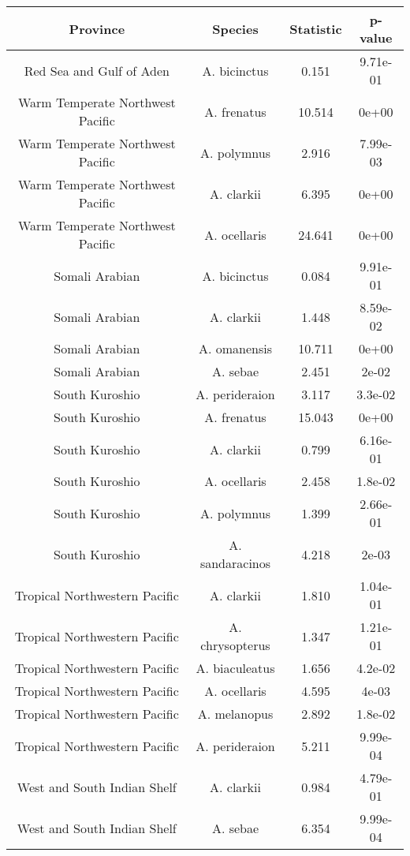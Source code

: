 \begin{table}[!h]
\centering\centering
\centering
\begin{tabular}[t]{c|c|c|c}
\hline
Province & Species & Statistic & p-value\\
\hline
Red Sea and Gulf of Aden & A. bicinctus & 0.151 & 9.71e-01\\
\hline
Warm Temperate Northwest Pacific & A. frenatus & 10.514 & 0e+00\\
\hline
Warm Temperate Northwest Pacific & A. polymnus & 2.916 & 7.99e-03\\
\hline
Warm Temperate Northwest Pacific & A. clarkii & 6.395 & 0e+00\\
\hline
Warm Temperate Northwest Pacific & A. ocellaris & 24.641 & 0e+00\\
\hline
Somali Arabian & A. bicinctus & 0.084 & 9.91e-01\\
\hline
Somali Arabian & A. clarkii & 1.448 & 8.59e-02\\
\hline
Somali Arabian & A. omanensis & 10.711 & 0e+00\\
\hline
Somali Arabian & A. sebae & 2.451 & 2e-02\\
\hline
South Kuroshio & A. perideraion & 3.117 & 3.3e-02\\
\hline
South Kuroshio & A. frenatus & 15.043 & 0e+00\\
\hline
South Kuroshio & A. clarkii & 0.799 & 6.16e-01\\
\hline
South Kuroshio & A. ocellaris & 2.458 & 1.8e-02\\
\hline
South Kuroshio & A. polymnus & 1.399 & 2.66e-01\\
\hline
South Kuroshio & A. sandaracinos & 4.218 & 2e-03\\
\hline
Tropical Northwestern Pacific & A. clarkii & 1.810 & 1.04e-01\\
\hline
Tropical Northwestern Pacific & A. chrysopterus & 1.347 & 1.21e-01\\
\hline
Tropical Northwestern Pacific & A. biaculeatus & 1.656 & 4.2e-02\\
\hline
Tropical Northwestern Pacific & A. ocellaris & 4.595 & 4e-03\\
\hline
Tropical Northwestern Pacific & A. melanopus & 2.892 & 1.8e-02\\
\hline
Tropical Northwestern Pacific & A. perideraion & 5.211 & 9.99e-04\\
\hline
West and South Indian Shelf & A. clarkii & 0.984 & 4.79e-01\\
\hline
West and South Indian Shelf & A. sebae & 6.354 & 9.99e-04\\

\end{tabular}
\end{table}
